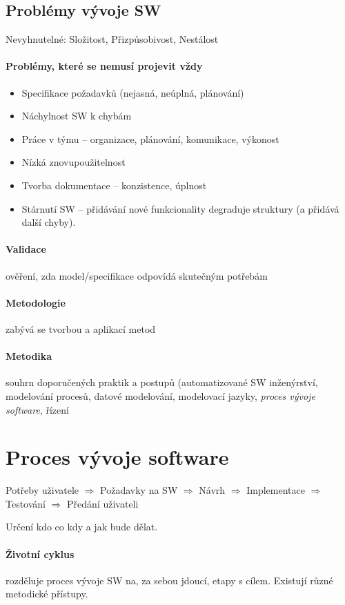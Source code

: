 \documentclass[a4paper, 11pt]{report}
\begin{document}
\subsection{Problémy vývoje SW} Nevyhnutelné: Složitost, Přizpůsobivost, Nestálost

\paragraph{Problémy, které se nemusí projevit vždy}
\begin{itemize}
	\item Specifikace požadavků (nejasná, neúplná, plánování)
	\item Náchylnost SW k chybám
	\item Práce v týmu -- organizace, plánování, komunikace, výkonost
	\item Nízká znovupoužitelnost
	\item Tvorba dokumentace -- konzistence, úplnost
	\item Stárnutí SW -- přidávání nové funkcionality degraduje struktury (a přidává další chyby).
\end{itemize}

\paragraph{Validace} ověření, zda model/specifikace odpovídá skutečným potřebám
\paragraph{Metodologie} zabývá se tvorbou a aplikací metod
\paragraph{Metodika} souhrn doporučených praktik a postupů (automatizované SW inženýrství, modelování procesů, datové modelování, modelovací jazyky, \emph{proces vývoje software}, řízení

\section{Proces vývoje software}

Potřeby uživatele $\Rightarrow$ Požadavky na SW $\Rightarrow$ Návrh $\Rightarrow$ Implementace $\Rightarrow$ Testování $\Rightarrow$ Předání uživateli

Určení kdo co kdy a jak bude dělat.

\paragraph{Životní cyklus} rozděluje proces vývoje SW na, za sebou jdoucí, etapy s cílem. Existují různé metodické přístupy.
\end{document}

